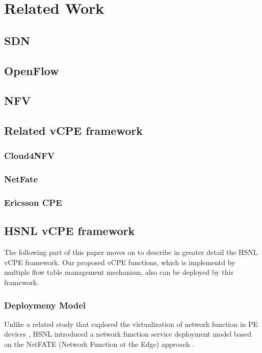 \chapter{Related Work}\label{ch:related_work}
\section{SDN}



\section{OpenFlow}



\section{NFV}



\section{Related vCPE framework}
\subsection{Cloud4NFV}


\subsection{NetFate}


\subsection{Ericsson CPE}



\section{HSNL vCPE framework}
The following part of this paper moves on to describe in greater detail the HSNL vCPE framework. Our proposed vCPE functions, which is implementd by multiple flow table management mechanism, also can be deployed by this framework.


\subsection{Deploymeny Model}
Unlike a related study that explored the virtualization of network function in PE devices \cite{vcpe-enhance}, HSNL introduced a network function service deployment model based on the NetFATE (Network Function at the Edge) approach \cite{netfate}.

